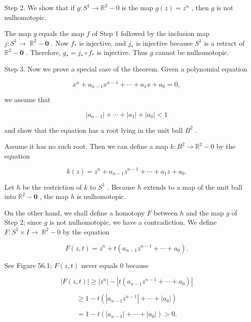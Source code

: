 \documentclass[10pt]{article}
\begin{document}
Step 2. We show that if \(g : {S}^{1} \rightarrow  {\mathbb{R}}^{2} - 0\) is the map \(g\left( z\right)  = {z}^{n}\) , then \(g\) is not nulhomotopic.

The map \(g\) equals the map \(f\) of Step 1 followed by the inclusion map \(j : {S}^{1} \rightarrow \; {\mathbb{R}}^{2} - \mathbf{0}\) . Now \({f}_{ * }\) is injective, and \({j}_{ * }\) is injective because \({S}^{1}\) is a retract of \({\mathbb{R}}^{2} - \mathbf{0}\) . Therefore, \({g}_{ * } = {j}_{ * } \circ  {f}_{ * }\) is injective. Thus \(g\) cannot be nulhomotopic.

Step 3. Now we prove a special case of the theorem. Given a polynomial equation

\[
{x}^{n} + {a}_{n - 1}{x}^{n - 1} + \cdots  + {a}_{1}x + {a}_{0} = 0,
\]

we assume that

\[
\left| {a}_{n - 1}\right|  + \cdots  + \left| {a}_{1}\right|  + \left| {a}_{0}\right|  < 1
\]

and show that the equation has a root lying in the unit ball \({B}^{2}\) .

Assume it has no such root. Then we can define a map \(k : {B}^{2} \rightarrow  {\mathbb{R}}^{2} - 0\) by the equation

\[
k\left( z\right)  = {z}^{n} + {a}_{n - 1}{z}^{n - 1} + \cdots  + {a}_{1}z + {a}_{0}.
\]

Let \(h\) be the restriction of \(k\) to \({S}^{1}\) . Because \(h\) extends to a map of the unit ball into \({\mathbb{R}}^{2} - \mathbf{0}\) , the map \(h\) is nulhomotopic.

On the other hand, we shall define a homotopy \(F\) between \(h\) and the map \(g\) of Step 2; since \(g\) is not nulhomotopic, we have a contradiction. We define \(F : {S}^{1} \times  I \rightarrow \; {\mathbb{R}}^{2} - 0\) by the equation

\[
F\left( {z,t}\right)  = {z}^{n} + t\left( {{a}_{n - 1}{z}^{n - 1} + \cdots  + {a}_{0}}\right) .
\]

See Figure 56.1; \(F\left( {z,t}\right)\) never equals 0 because

\[
\left| {F\left( {z,t}\right) }\right|  \geq  \left| {z}^{n}\right|  - \left| {t\left( {{a}_{n - 1}{z}^{n - 1} + \cdots  + {a}_{0}}\right) }\right|
\]

\[
\geq  1 - t\left( {\left| {{a}_{n - 1}{z}^{n - 1}}\right|  + \cdots  + \left| {a}_{0}\right| }\right)
\]

\[
= 1 - t\left( {\left| {a}_{n - 1}\right|  + \cdots  + \left| {a}_{0}\right| }\right)  > 0.
\]
\end{document}
